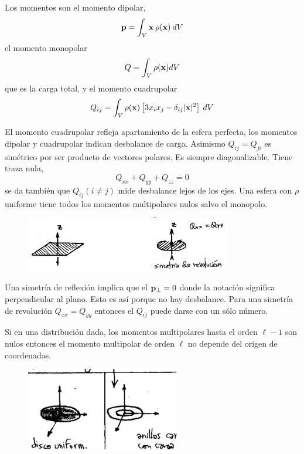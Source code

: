 \documentclass[10pt,oneside]{CBFT_book}
\begin{document}
Los momentos son el momento dipolar,
\[
	\vb{p} = \int_V \vb{x} \: \rho(\vb{x}) \: dV
\]
el momento monopolar
\[
	Q = \int_V \rho(\vb{x}) dV
\]
que es la carga total, y el momento cuadrupolar
\[
	Q_{ij} = \int_V  \rho(\vb{x}) \left[ 3 x_i x_j - \delta_{ij} |\vb{x}|^2 \right] \: dV
\]

El momento cuadrupolar refleja apartamiento de la esfera perfecta, los momentos dipolar y cuadrupolar
indican desbalance de carga.
Asimismo $Q_{ij} = Q_{ji}$ es simétrico por ser producto de vectores polares.
Es siempre diagonalizable. Tiene traza nula,
\[
	Q_{xx} + Q_{yy} + Q_{zz}  = 0
\]
se da también que $Q_{ij} (i\neq j)$ mide desbalance lejos de los ejes.
Una esfera con $\rho$ uniforme tiene todos los momentos multipolares nulos salvo el monopolo.

\begin{figure}[htb]
	\begin{center}
	\includegraphics[width=0.8\textwidth]{images/fig_ft1_multipolo2.pdf}	 
	\end{center}
	\caption{}
\end{figure}

Una simetría de reflexión implica que el $\vb{p}_\perp = 0$ donde la notación significa perpendicular
al plano. Esto es así porque no hay desbalance. Para una simetría de revolución $Q_{xx}=Q_{yy}$ entonces
el $Q_{ij}$ puede darse con un sólo número.

Si en una distribución dada, los momentos multipolares hasta el orden $\ell -1$ son nulos entonces
el momento multipolar de orden $\ell$ no depende del origen de coordenadas.

\begin{figure}[htb]
	\begin{center}
	\includegraphics[width=0.6\textwidth]{images/fig_ft1_multipolo3.pdf}	 
	\end{center}
	\caption{}
\end{figure}
\end{document}
